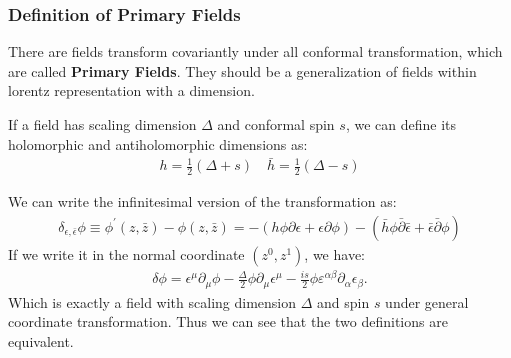 \subsubsection{Definition of Primary Fields}
There are fields transform covariantly under all conformal transformation, which are called \textbf{Primary Fields}. They should be a generalization of fields within lorentz representation with a dimension.

If a field has scaling dimension $ \Delta $ and conformal spin $ s $, we can define its holomorphic and antiholomorphic dimensions as:
\begin{align}
  h=\frac{1}{2}(\Delta+s) \quad \bar{h}=\frac{1}{2}(\Delta-s)
\end{align}

We can write the infinitesimal version of the transformation as:
\begin{align}
  \delta_{\epsilon,\bar{\epsilon}}\phi\equiv\phi^{\prime}(z,\bar{z})-\phi(z,\bar{z})=-(h\phi\partial\epsilon+\epsilon\partial\phi)- (\bar{h}\phi\bar\partial\bar{\epsilon}+\bar{\epsilon}\bar\partial\phi)
\end{align}
If we write it in the normal coordinate $ (z^0,z^1) $, we have:
\begin{align}
  \delta\phi=\epsilon^\mu\partial_\mu\phi-\frac{\Delta}{2}\phi\partial_\mu\epsilon^\mu-\frac{is}{2}\phi\varepsilon^{\alpha\beta}\partial_\alpha\epsilon_\beta.
\end{align}
Which is exactly a field with scaling dimension $ \Delta $ and spin $ s $ under general coordinate transformation. Thus we can see that the two definitions are equivalent.


